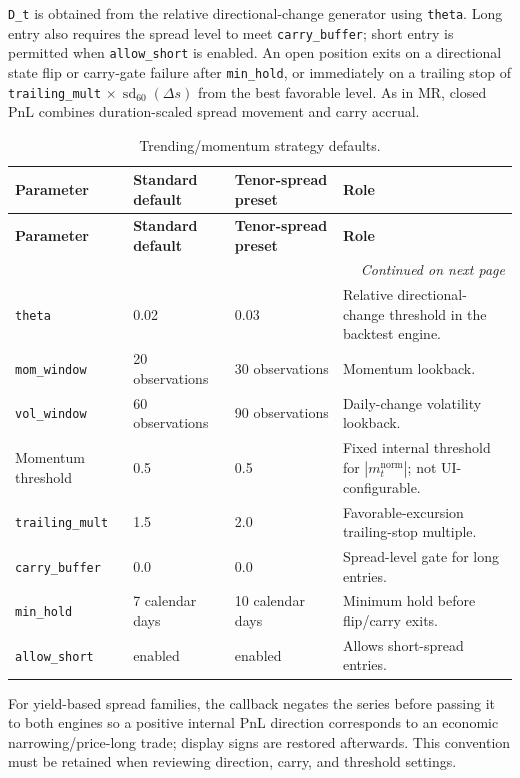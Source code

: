 \texttt{D\_t} is obtained from the relative directional-change generator using \texttt{theta}.
Long entry also requires the spread level to meet \texttt{carry\_buffer}; short entry is
permitted when \texttt{allow\_short} is enabled. An open position exits on a directional
state flip or carry-gate failure after \texttt{min\_hold}, or immediately on a trailing
stop of \texttt{trailing\_mult} $\times\, \operatorname{sd}_{60}(\Delta s)$ from the best favorable level.
As in MR, closed PnL combines duration-scaled spread movement and carry accrual.

{\small
\setlength{\LTleft}{0pt}
\setlength{\LTright}{0pt}
\setlength{\tabcolsep}{5pt}
\renewcommand{\arraystretch}{1.15}
\begin{longtable}{p{} p{} p{} p{}}
\caption{Trending/momentum strategy defaults.}\label{tab:pairs-trend-defaults-overleaf} \\
\hline
\textbf{Parameter} & \textbf{Standard default} & \textbf{Tenor-spread preset} & \textbf{Role} \\
\hline
\endfirsthead
\hline
\textbf{Parameter} & \textbf{Standard default} & \textbf{Tenor-spread preset} & \textbf{Role} \\
\hline
\endhead
\hline
\multicolumn{4}{r}{\textit{Continued on next page}} \\
\hline
\endfoot
\hline
\endlastfoot
\texttt{theta} & 0.02 & 0.03 & Relative directional-change threshold in the backtest engine. \\
\texttt{mom\_window} & 20 observations & 30 observations & Momentum lookback. \\
\texttt{vol\_window} & 60 observations & 90 observations & Daily-change volatility lookback. \\
Momentum threshold & 0.5 & 0.5 & Fixed internal threshold for $\left|m_t^{\mathrm{norm}}\right|$; not UI-configurable. \\
\texttt{trailing\_mult} & 1.5 & 2.0 & Favorable-excursion trailing-stop multiple. \\
\texttt{carry\_buffer} & 0.0 & 0.0 & Spread-level gate for long entries. \\
\texttt{min\_hold} & 7 calendar days & 10 calendar days & Minimum hold before flip/carry exits. \\
\texttt{allow\_short} & enabled & enabled & Allows short-spread entries. \\
\end{longtable}
}

For yield-based spread families, the callback negates the series before passing it
to both engines so a positive internal PnL direction corresponds to an economic
narrowing/price-long trade; display signs are restored afterwards. This convention
must be retained when reviewing direction, carry, and threshold settings.

